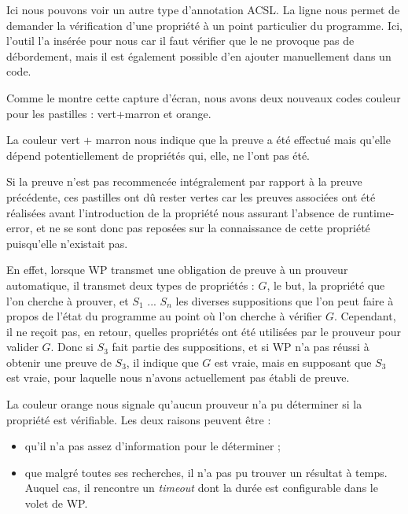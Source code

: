 Ici nous pouvons voir un autre type d'annotation ACSL. La 
ligne  nous permet de demander la vérification 
d'une propriété à un point particulier du programme. Ici, l'outil l'a 
insérée pour nous car il faut vérifier que le  ne provoque pas de 
débordement, mais il est également possible d'en ajouter manuellement dans 
un code.



Comme le montre cette capture d'écran, nous avons deux nouveaux codes couleur
pour les pastilles : vert+marron et orange.



La couleur vert + marron nous indique que la preuve a été effectué mais 
qu'elle dépend potentiellement de propriétés qui, elle, ne l'ont pas été.



Si  la preuve n'est pas recommencée intégralement par rapport à la preuve 
précédente, ces pastilles ont dû rester vertes car les preuves associées ont
été réalisées avant l'introduction de la propriété nous assurant l'absence 
de runtime-error, et ne se sont donc pas reposées sur la connaissance de cette
propriété puisqu'elle n'existait pas.



En effet, lorsque WP transmet une obligation de preuve à un prouveur automatique,
il transmet deux types de propriétés : $G$, le but, la propriété 
que l'on cherche à prouver, et $S_1$ ... $S_n$ les diverses suppositions que l'on
peut faire à propos de l'état du programme au point où l'on cherche à vérifier $G$.
Cependant, il ne reçoit pas, en retour, quelles propriétés ont été utilisées par
le prouveur pour valider $G$. Donc si $S_3$ fait partie des suppositions, et si
WP n'a pas réussi à obtenir une preuve de $S_3$, il indique que $G$ est vraie, mais
en supposant que $S_3$ est vraie, pour laquelle nous n'avons actuellement pas
établi de preuve.



La couleur orange nous signale qu'aucun prouveur n'a pu déterminer si la 
propriété est vérifiable. Les deux raisons peuvent être :



\begin{itemize}
\item qu'il n'a pas assez d'information pour le déterminer ;
\item que malgré toutes ses recherches, il n'a pas pu trouver un résultat à 
temps. Auquel cas, il rencontre un \textit{timeout} dont la durée est configurable 
dans le volet de WP.
\end{itemize}


